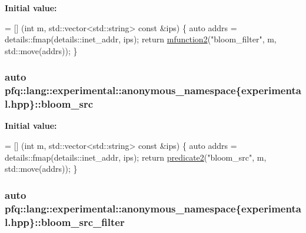 {\bfseries Initial value\+:}
\begin{DoxyCode}
= [] (\textcolor{keywordtype}{int} m, std::vector<std::string> \textcolor{keyword}{const} &ips) \{
                                    \textcolor{keyword}{auto} addrs = details::fmap(details::inet\_addr, ips);
                                    \textcolor{keywordflow}{return} \hyperlink{namespacepfq_1_1lang_aab1a000712bb2711044255ca1626cc84}{mfunction2}(\textcolor{stringliteral}{"bloom\_filter"}, m, std::move(addrs));
                                \}
\end{DoxyCode}
\hypertarget{namespacepfq_1_1lang_1_1experimental_1_1anonymous__namespace_02experimental_8hpp_03_a3d4a047a7fd3d6cb24151a72832153bb}{
\subsubsection[{bloom\+\_\+src}]{\setlength{\rightskip}{0pt plus 5cm}auto pfq\+::lang\+::experimental\+::anonymous\+\_\+namespace\{experimental.\+hpp\}\+::bloom\+\_\+src}}\label{namespacepfq_1_1lang_1_1experimental_1_1anonymous__namespace_02experimental_8hpp_03_a3d4a047a7fd3d6cb24151a72832153bb}
{\bfseries Initial value\+:}
\begin{DoxyCode}
= [] (\textcolor{keywordtype}{int} m, std::vector<std::string> \textcolor{keyword}{const} &ips) \{
                                \textcolor{keyword}{auto} addrs = details::fmap(details::inet\_addr, ips);
                                \textcolor{keywordflow}{return} \hyperlink{namespacepfq_1_1lang_a7282b9a2e51359b8db0dcdb9fadf2fd1}{predicate2}(\textcolor{stringliteral}{"bloom\_src"}, m, std::move(addrs));
                          \}
\end{DoxyCode}
\hypertarget{namespacepfq_1_1lang_1_1experimental_1_1anonymous__namespace_02experimental_8hpp_03_ae39622e71bbc0eaa235b7dce5948891e}{
\subsubsection[{bloom\+\_\+src\+\_\+filter}]{\setlength{\rightskip}{0pt plus 5cm}auto pfq\+::lang\+::experimental\+::anonymous\+\_\+namespace\{experimental.\+hpp\}\+::bloom\+\_\+src\+\_\+filter}}\label{namespacepfq_1_1lang_1_1experimental_1_1anonymous__namespace_02experimental_8hpp_03_ae39622e71bbc0eaa235b7dce5948891e}
